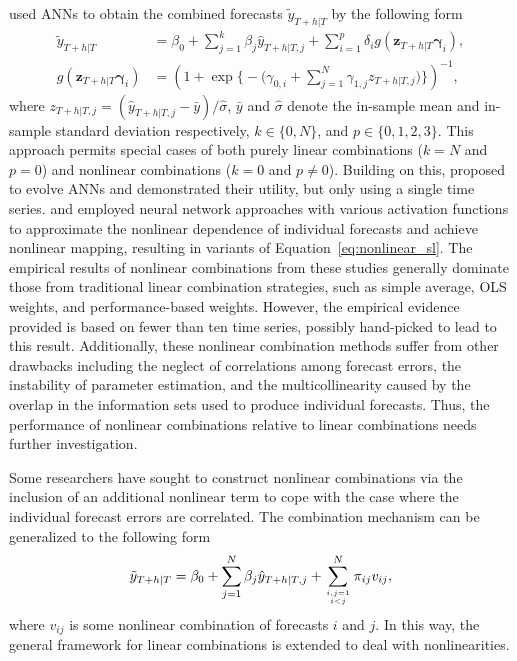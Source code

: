 \documentclass[a4paper,11pt]{article}
\begin{document}
\citet{Donaldson1996-um} used ANNs to obtain the combined forecasts $\tilde{y}_{T+h|T}$ by the following form
\begin{align}
  \tilde{y}_{T+h|T} & =
    \beta_{0}+\sum_{j=1}^{k} \beta_{j} \hat{y}_{T+h|T, j}+\sum_{i=1}^{p} \delta_{i} g(\bm{z}_{T+h|T} \bm{\gamma}_{i}), \label{eq:nonlinear_sl} \\
  g(\bm{z}_{T+h|T} \bm{\gamma}_{i}) & =
    \left(1+\exp \bigg\{-\Big(\gamma_{0, i}+\sum_{j=1}^{N} \gamma_{1, j} z_{T+h|T, j}\Big)\bigg\}\right)^{-1},
\end{align}
where $z_{T+h|T, j} = (\hat{y}_{T+h|T, j}-\bar{y}) / \hat{\sigma}$, $\bar{y}$ and $\hat{\sigma}$ denote the in-sample mean and in-sample standard deviation respectively, $k \in \{0,N\}$, and $p \in \{0,1,2,3\}$. This approach permits special cases of both purely linear combinations ($k=N$ and $p=0$) and nonlinear combinations ($k=0$ and $p\neq 0$). Building on this, \citet{Harrald1997-gd} proposed to evolve ANNs and demonstrated their utility, but only using a single time series. \citet{Krasnopolsky2012-xu} and \citet{Babikir2016-xz} employed neural network approaches with various activation functions to approximate the nonlinear dependence of individual forecasts and achieve nonlinear mapping, resulting in variants of Equation~\eqref{eq:nonlinear_sl}. The empirical results of nonlinear combinations from these studies generally dominate those from traditional linear combination strategies, such as simple average, OLS weights, and performance-based weights. However, the empirical evidence provided is based on fewer than ten time series, possibly hand-picked to lead to this result. Additionally, these nonlinear combination methods suffer from other drawbacks including the neglect of correlations among forecast errors, the instability of parameter estimation, and the multicollinearity caused by the overlap in the information sets used to produce individual forecasts. Thus, the performance of nonlinear combinations relative to linear combinations needs further investigation.

Some researchers have sought to construct nonlinear combinations via the inclusion of an additional nonlinear term to cope with the case where the individual forecast errors are correlated. The combination mechanism can be generalized to the following form
\begin{align*}
  \tilde{y}_{T+h|T} =\beta_{0}+\sum_{j=1}^{N} \beta_{j} \hat{y}_{T+h|T, j}+\sum_{i,j=1 \atop i<j}^{N}\pi_{ij}v_{i j},
\end{align*}
where $v_{ij}$ is some nonlinear combination of forecasts $i$ and $j$. In this way, the general framework for linear combinations is extended to deal with nonlinearities.
\end{document}
